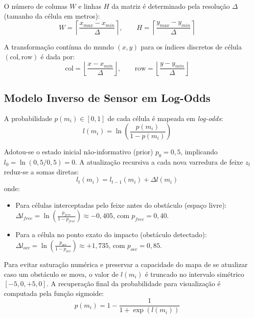 \documentclass[11pt,a4paper]{article}
\begin{document}
O número de colunas $W$ e linhas $H$ da matriz é determinado pela resolução $\Delta$ (tamanho da célula em metros):
\begin{equation}
    W = \left\lceil \frac{x_{max} - x_{min}}{\Delta} \right\rceil, \qquad H = \left\lceil \frac{y_{max} - y_{min}}{\Delta} \right\rceil
\end{equation}

A transformação contínua do mundo $(x, y)$ para os índices discretos de célula $(\text{col}, \text{row})$ é dada por:
\begin{equation}
    \text{col} = \left\lfloor \frac{x - x_{min}}{\Delta} \right\rfloor, \qquad \text{row} = \left\lfloor \frac{y - y_{min}}{\Delta} \right\rfloor
\end{equation}

\subsection{Modelo Inverso de Sensor em Log-Odds}
A probabilidade $p(m_i) \in [0, 1]$ de cada célula é mapeada em \textit{log-odds}:
\begin{equation}
    l(m_i) = \ln \left( \frac{p(m_i)}{1 - p(m_i)} \right)
\end{equation}

Adotou-se o estado inicial não-informativo (prior) $p_0 = 0{,}5$, implicando $l_0 = \ln(0{,}5/0{,}5) = 0$. A atualização recursiva a cada nova varredura de feixe $z_t$ reduz-se a somas diretas:
\begin{equation}
    l_t(m_i) = l_{t-1}(m_i) + \Delta l(m_i)
\end{equation}
onde:
\begin{itemize}
    \item Para células interceptadas pelo feixe antes do obstáculo (espaço livre): $\Delta l_{free} = \ln \left( \frac{p_{free}}{1 - p_{free}} \right) \approx -0{,}405$, com $p_{free} = 0{,}40$.
    \item Para a célula no ponto exato do impacto (obstáculo detectado): $\Delta l_{occ} = \ln \left( \frac{p_{occ}}{1 - p_{occ}} \right) \approx +1{,}735$, com $p_{occ} = 0{,}85$.
\end{itemize}

Para evitar saturação numérica e preservar a capacidade do mapa de se atualizar caso um obstáculo se mova, o valor de $l(m_i)$ é truncado no intervalo simétrico $[-5{,}0, +5{,}0]$. A recuperação final da probabilidade para visualização é computada pela função sigmoide:
\begin{equation}
    p(m_i) = 1 - \frac{1}{1 + \exp(l(m_i))}
\end{equation}
\end{document}

